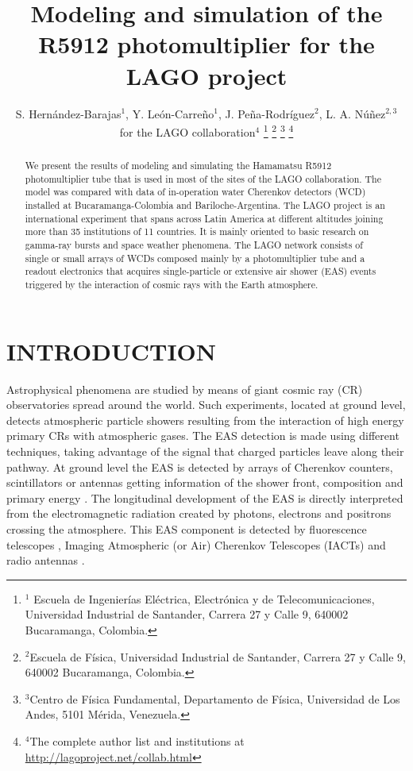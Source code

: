 \documentclass[letterpaper, 10 pt, conference]{ieeeconf}  %
\title{\LARGE \bf
Modeling and simulation of the R5912 photomultiplier for the LAGO project
}
\author{S. Hern\'andez-Barajas$^{1}$, Y. Le\'on-Carre\~no$^{1}$, J. Pe\~na-Rodr\'iguez$^{2}$, L. A. N\'u\~nez$^{2,3}$\\ for the LAGO collaboration$^{4}$%
\thanks{$^{1}$ Escuela de Ingenierías El\'ectrica, Electr\'onica y de Telecomunicaciones, Universidad Industrial de Santander, Carrera 27 y Calle 9, 640002 Bucaramanga, Colombia.
}
\thanks{$^{2}$Escuela de F\'isica, Universidad Industrial de Santander, Carrera 27 y Calle 9, 640002 Bucaramanga, Colombia.}
\thanks{$^{3}$Centro de F\'isica Fundamental, Departamento de F\'isica, Universidad de Los Andes, 5101 M\'erida, Venezuela.}
\thanks{$^{4}$The complete author list and institutions at \url{http://lagoproject.net/collab.html}}
}
\begin{document}
\maketitle
\thispagestyle{empty}
\pagestyle{empty}



\begin{abstract}
We present the results of modeling and simulating the Hamamatsu R5912 photomultiplier tube that is used in most of the sites of the LAGO collaboration. The model was compared with data of in-operation water Cherenkov detectors (WCD) installed at Bucaramanga-Colombia and Bariloche-Argentina. The LAGO project is an international experiment that spans across Latin America at different altitudes joining more than 35 institutions of 11 countries. It is mainly oriented to basic research on gamma-ray bursts and space weather phenomena. The LAGO network consists of single or small arrays of WCDs composed mainly by a photomultiplier tube and a readout electronics that acquires single-particle or extensive air shower (EAS) events triggered by the interaction of cosmic rays with the Earth atmosphere. 
\end{abstract}


\section{INTRODUCTION}

Astrophysical phenomena are studied by means of giant cosmic ray (CR) observatories spread around the world. Such experiments, located at ground level, detects atmospheric particle showers resulting from the interaction of high energy primary CRs with atmospheric gases. The EAS detection is made using different techniques, taking advantage of the signal that charged particles leave along their pathway. At ground level the EAS is detected by arrays of Cherenkov counters, scintillators or antennas getting information of the shower front, composition and primary energy \cite{Bertou2006, Galindo2017}. The longitudinal development of the EAS is directly interpreted from the electromagnetic radiation created by photons, electrons and positrons crossing the atmosphere. This EAS component is detected by fluorescence telescopes \cite{Neesal2011}, Imaging Atmospheric (or Air) Cherenkov Telescopes (IACTs) \cite{Schoorlemmer2019} and radio antennas \cite{Aab2016, Schrder2016}.
\end{document}
